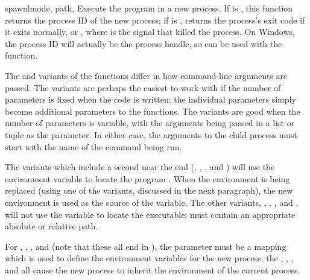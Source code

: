 \begin{funcdesc}{spawnl}{mode, path, \moreargs}
Execute the program  in a new process.  If  is
, this function returns the process ID of the new
process; if  is , returns the process's
exit code if it exits normally, or , where
 is the signal that killed the process.  On Windows, the
process ID will actually be the process handle, so can be used with
the  function.

The  and  variants of the
 functions differ in how command-line arguments are
passed.  The  variants are perhaps the easiest to work
with if the number of parameters is fixed when the code is written;
the individual parameters simply become additional parameters to the
 functions.  The  variants are good
when the number of parameters is variable, with the arguments being
passed in a list or tuple as the  parameter.  In either
case, the arguments to the child process must start with the name of
the command being run.

The variants which include a second  near the end
(, , ,
and ) will use the  environment
variable to locate the program .  When the environment is
being replaced (using one of the  variants,
discussed in the next paragraph), the new environment is used as the
source of the  variable.  The other variants,
, , , and
, will not use the  variable to
locate the executable;  must contain an appropriate absolute
or relative path.

For , , ,
and  (note that these all end in ),
the  parameter must be a mapping which is used to define the
environment variables for the new process; the ,
, , and 
all cause the new process to inherit the environment of the current
process.


\end{funcdesc}
